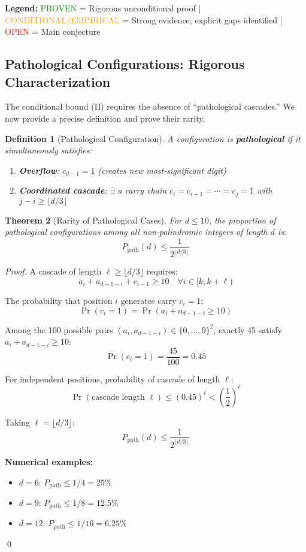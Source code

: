 \documentclass[12pt,a4paper]{article}
\newtheorem{theorem}{Theorem}[section]
\newtheorem{definition}[theorem]{Definition}
\begin{document}
						\textbf{Legend:} 
			\textcolor{green}{PROVEN} = Rigorous unconditional proof | 
			\textcolor{orange}{CONDITIONAL/EMPIRICAL} = Strong evidence, explicit gaps identified | 
			\textcolor{red}{OPEN} = Main conjecture

\subsection{Pathological Configurations: Rigorous Characterization}

The conditional bound (II) requires the absence of ``pathological cascades.'' 
We now provide a precise definition and prove their rarity.

\begin{definition}[Pathological Configuration]\label{def:pathological_unique}
A configuration is \textbf{pathological} if it simultaneously satisfies:
\begin{enumerate}
\item \textbf{Overflow}: $c_{d-1} = 1$ (creates new most-significant digit)
\item \textbf{Coordinated cascade}: $\exists$ a carry chain 
$c_i = c_{i+1} = \cdots = c_j = 1$ with $j - i \geq \lfloor d/3 \rfloor$
\end{enumerate} %
\end{definition}

\begin{theorem}[Rarity of Pathological Cases]\label{thm:pathological_rare_unique}
For $d \le 10$, the proportion of pathological configurations among all 
non-palindromic integers of length $d$ is:
$$P_{\mathrm{path}}(d) \le \frac{1}{2^{\lfloor d/3 \rfloor}}$$
\end{theorem}

\begin{proof}
A cascade of length $\ell \ge \lfloor d/3 \rfloor$ requires:
$$a_i + a_{d-1-i} + c_{i-1} \ge 10 \quad \forall i \in [k, k+\ell)$$

The probability that position $i$ generates carry $c_i = 1$:
$$\Pr(c_i = 1) = \Pr(a_i + a_{d-1-i} \ge 10)$$

Among the 100 possible pairs $(a_i, a_{d-1-i}) \in \{0,\ldots,9\}^2$, 
exactly 45 satisfy $a_i + a_{d-1-i} \ge 10$:
$$\Pr(c_i = 1) = \frac{45}{100} = 0.45$$

For independent positions, probability of cascade of length $\ell$:
$$\Pr(\text{cascade length } \ell) \le (0.45)^\ell < \left(\frac{1}{2}\right)^\ell$$

Taking $\ell = \lfloor d/3 \rfloor$:
$$P_{\mathrm{path}}(d) \le \frac{1}{2^{\lfloor d/3 \rfloor}}$$

	\textbf{Numerical examples:}
\begin{itemize}
\item $d=6$: $P_{\mathrm{path}} \le 1/4 = 25\%$
\item $d=9$: $P_{\mathrm{path}} \le 1/8 = 12.5\%$
\item $d=12$: $P_{\mathrm{path}} \le 1/16 = 6.25\%$
\end{itemize}
\qed
\end{proof}
\end{document}
